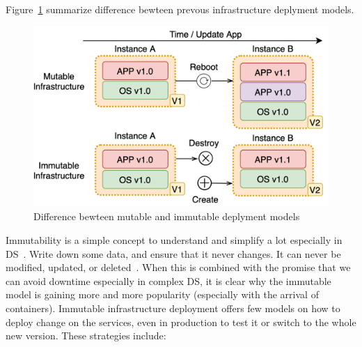 Figure~\ref{fig:fig12} summarize difference bewteen prevous infrastructure deplyment models.

\begin{figure}[H]
	\begin{center}
		\includegraphics[scale=0.9]{images/Figure12.png}
	\end{center}
	\vspace{-0.6cm}
	\caption{Difference bewteen mutable and immutable deplyment models}
	\label{fig:fig12}
\end{figure}

Immutability is a simple concept to understand and simplify a lot especially in DS~\cite{Helland16}. Write down some data, and ensure that it never changes. It can never be modified, updated, or deleted~\cite{perry2020art}. When this is combined with the promise that we can avoid downtime especially in complex DS, it is clear why the immutable model is gaining more and more popularity (especially with the arrival of containers). Immutable infrastructure deployment offers few models on how to deploy change on the services, even in production to test it or switch to the whole new version. These strategies include:

